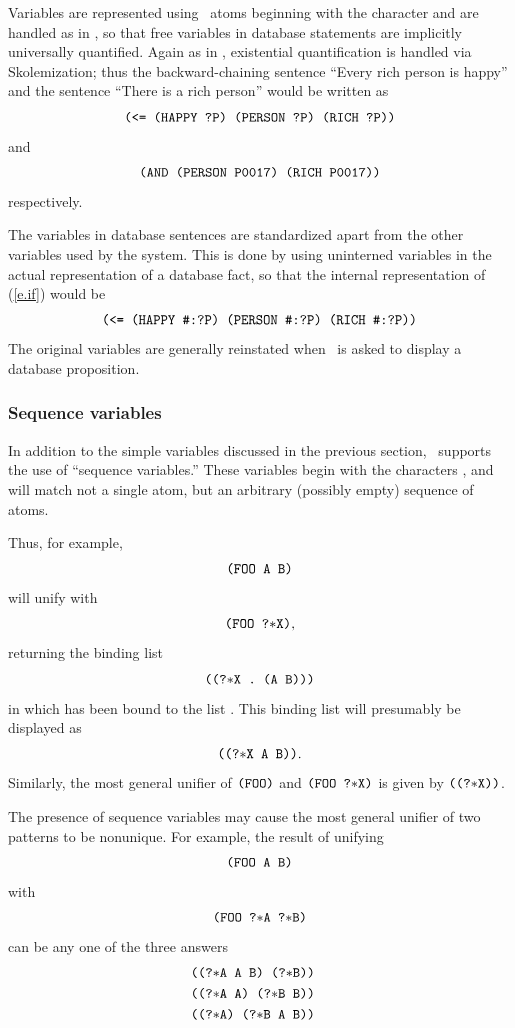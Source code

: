 Variables  are represented using \lisp\ atoms
beginning with the character  and are handled as in \prolog,
so that free variables in database statements are implicitly
universally quantified.  Again as in \prolog, existential
quantification is handled via Skolemization; thus the
backward-chaining sentence ``Every rich person is happy'' and the
sentence ``There is a rich person'' would be written as
 \begin{equation}
\mbox{\tt (<= (HAPPY ?P) (PERSON ?P) (RICH ?P))}
\label{e.if}
\end{equation}
and
 \[\mbox{\tt (AND (PERSON P0017) (RICH P0017))}\]
respectively.

The variables in database sentences are standardized apart from the
other variables used by the system.  This is done by using uninterned
variables in the actual representation of a database fact, so that
the internal representation of (\ref{e.if}) would be
 \[\mbox{\tt (<= (HAPPY \#:?P) (PERSON \#:?P) (RICH \#:?P))}\]
 The original variables are generally reinstated when \mvl\ is asked
to display a database proposition.

\subsubsection{Sequence variables}

In addition to the simple variables discussed in the previous
section, \mvl\ supports the use of ``sequence
variables.'' These variables begin with the
characters \type{\str}, and will match not a single atom, but an
arbitrary (possibly empty) sequence of atoms.

Thus, for example,
 \[\mbox{\tt (FOO A B)}\]
 will unify with
 \[\mbox{\tt (FOO ?$*$X)},\]
 returning the binding list
 \[\mbox{\tt ((?$*$X . (A B)))}\]
 in which  has been bound to the list .  This
binding list will presumably be displayed as
 \[\mbox{\tt ((?$*$X A B))}.\]
 Similarly, the most general unifier of $\mbox{\tt (FOO)}$ and
$\mbox{\tt (FOO ?$*$X)}$ is given by $\mbox{\tt ((?$*$X))}$.

The presence of sequence variables may cause the most general unifier
of two patterns to be nonunique.  For example, the result of unifying
 \[\mbox{\tt (FOO A B)}\]
 with
 \[\mbox{\tt (FOO ?$*$A ?$*$B)}\]
 can be any one of the three answers
 \begin{eqnarray*}
& \mbox{\tt ((?$*$A A B) (?$*$B))} & \\
& \mbox{\tt ((?$*$A A) (?$*$B B))} & \\
& \mbox{\tt ((?$*$A) (?$*$B A B))} &
 \end{eqnarray*}

